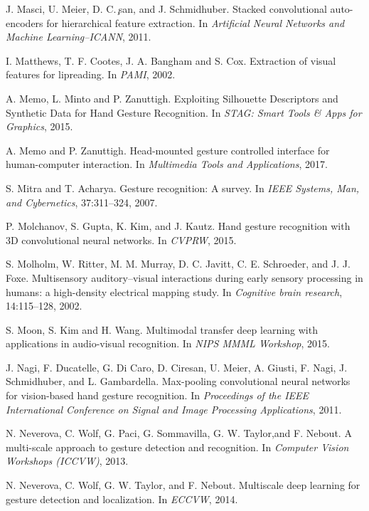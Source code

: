 \begin{thebibliography}{99}
{
  J. Masci, U. Meier, D. C. ̧san, and J. Schmidhuber.
  Stacked convolutional auto-encoders for hierarchical feature extraction.
  In \textit{Artificial Neural Networks and Machine Learning–ICANN}, 2011.

  I. Matthews, T. F. Cootes, J. A. Bangham and S. Cox. Extraction of visual
  features for lipreading. In \textit{PAMI}, 2002.

  A. Memo, L. Minto and P. Zanuttigh.  Exploiting Silhouette Descriptors and
  Synthetic Data for Hand Gesture Recognition. In \textit{STAG: Smart
  Tools \& Apps for Graphics}, 2015.

  A. Memo and P. Zanuttigh. Head-mounted gesture controlled interface
  for human-computer interaction. In \textit{Multimedia Tools and
  Applications}, 2017.

  S. Mitra and T. Acharya. Gesture recognition: A survey. 
  In \textit{IEEE Systems, Man, and Cybernetics}, 37:311–324, 2007. 

  P. Molchanov, S. Gupta, K. Kim, and J. Kautz. Hand gesture recognition 
  with 3D convolutional neural networks. In \textit{CVPRW}, 2015.

  S. Molholm, W. Ritter, M. M. Murray, D. C. Javitt, C. E. Schroeder,
  and J. J. Foxe. Multisensory auditory–visual interactions during early
  sensory processing in humans: a high-density electrical mapping study.
  In \textit{Cognitive brain research}, 14:115--128, 2002.

  S. Moon, S. Kim and H. Wang. Multimodal transfer deep learning with
    applications in audio-visual recognition. In \textit{NIPS MMML
    Workshop}, 2015.

  J. Nagi, F. Ducatelle, G. Di Caro, D. Ciresan, U. Meier, A. Giusti,
  F. Nagi, J. Schmidhuber, and L. Gambardella.
  Max-pooling convolutional neural networks for vision-based hand 
  gesture recognition.
  In \textit{Proceedings of the IEEE International Conference on
  Signal and Image Processing Applications}, 2011.

  N. Neverova, C. Wolf, G. Paci, G. Sommavilla, G. W. Taylor,and F. Nebout.
  A multi-scale approach to gesture detection and recognition.
  In \textit{Computer Vision Workshops (ICCVW)}, 2013.

  N. Neverova, C. Wolf, G. W. Taylor, and F. Nebout.  Multiscale deep
  learning for gesture detection and localization. In \textit{ECCVW}, 2014.

}
\end{thebibliography}
